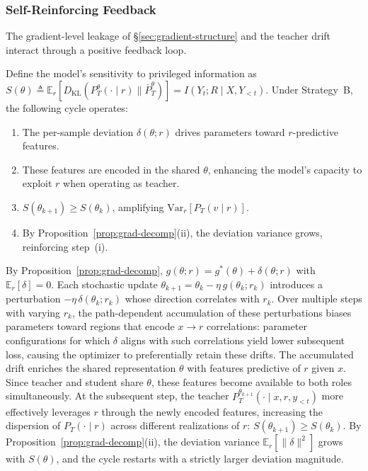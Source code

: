 \documentclass[]{jingdong}
\begin{document}
\subsubsection{Self-Reinforcing Feedback}

The gradient-level leakage of \S\ref{sec:gradient-structure} and the teacher drift interact through a positive feedback loop.

\begin{proposition}
\label{prop:feedback-loop}
Define the model's sensitivity to privileged information as $S(\theta) \triangleq \mathbb{E}_r[D_{\mathrm{KL}}(P_T^\theta(\cdot \mid r) \| \bar{P}_T^\theta)] = I(Y_t; R \mid X, Y_{<t})$. Under Strategy~B, the following cycle operates:
\begin{enumerate}[label=(\roman*),nosep]
    \item The per-sample deviation $\delta(\theta; r)$ drives parameters toward $r$-predictive features.
    \item These features are encoded in the shared $\theta$, enhancing the model's capacity to exploit $r$ when operating as teacher.
    \item $S(\theta_{k+1}) \geq S(\theta_k)$, amplifying $\mathrm{Var}_r[P_T(v \mid r)]$.
    \item By Proposition~\ref{prop:grad-decomp}(ii), the deviation variance grows, reinforcing step~(i).
\end{enumerate}
\end{proposition}


By Proposition~\ref{prop:grad-decomp}, $g(\theta; r) = g^*(\theta) + \delta(\theta; r)$ with $\mathbb{E}_r[\delta] = 0$. Each stochastic update $\theta_{k+1} = \theta_k - \eta\, g(\theta_k; r_k)$ introduces a perturbation $-\eta\, \delta(\theta_k; r_k)$ whose direction correlates with $r_k$. Over multiple steps with varying $r_k$, the path-dependent accumulation of these perturbations biases parameters toward regions that encode $x \to r$ correlations: parameter configurations for which $\delta$ aligns with such correlations yield lower subsequent loss, causing the optimizer to preferentially retain these drifts. The accumulated drift enriches the shared representation $\theta$ with features predictive of $r$ given $x$. Since teacher and student share $\theta$, these features become available to both roles simultaneously. At the subsequent step, the teacher $P_T^{\theta_{k+1}}(\cdot \mid x, r, y_{<t})$ more effectively leverages $r$ through the newly encoded features, increasing the dispersion of $P_T(\cdot \mid r)$ across different realizations of $r$: $S(\theta_{k+1}) \geq S(\theta_k)$. By Proposition~\ref{prop:grad-decomp}(ii), the deviation variance $\mathbb{E}_r[\|\delta\|^2]$ grows with $S(\theta)$, and the cycle restarts with a strictly larger deviation magnitude.
\end{document}
